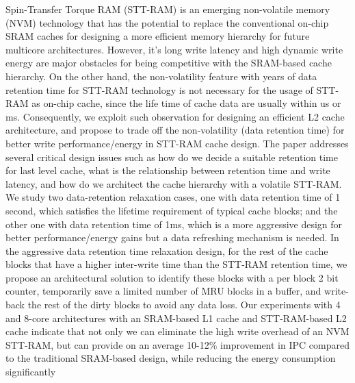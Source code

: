 \singlespacing

Spin-Transfer Torque RAM (STT-RAM) is an emerging non-volatile memory (NVM)
technology that has the potential to replace the conventional
on-chip SRAM caches for designing a more efficient memory hierarchy for
future multicore architectures.
However, it's long write latency and high dynamic
write energy are major obstacles for being competitive with the SRAM-based cache hierarchy.
On the other hand, the non-volatility feature with years of data retention time for STT-RAM technology is not necessary for the usage of STT-RAM as on-chip cache, since the life time of cache data are usually within us or ms. Consequently,  we exploit such observation for designing an efficient L2 cache
architecture, and propose to trade off the non-volatility (data retention time)
for better write performance/energy in STT-RAM cache design. The paper addresses several critical design issues such as how do we decide a suitable retention time for last level cache,
what is the relationship between retention time and write latency,
and how do we architect the cache hierarchy with a volatile STT-RAM.
We study two
data-retention relaxation cases, one with data retention time of 1 second, which satisfies the lifetime requirement of typical cache blocks; and the other one with data retention time of 1ms, which is a more aggressive design for better performance/energy gains but a data refreshing mechanism is needed.
In the aggressive data retention time relaxation design, for the rest of the cache blocks that have a higher inter-write
time than the STT-RAM retention time, we propose an architectural solution to identify these blocks
with a per block 2 bit counter, temporarily save a limited number of MRU blocks in a buffer,
and write-back the rest of the dirty blocks to avoid any data loss.
Our experiments with 4 and 8-core architectures with an SRAM-based L1 cache and STT-RAM-based L2 cache
indicate that not only we can eliminate the high write overhead of an NVM STT-RAM, but can provide
on an average 10-12\% improvement in IPC compared to the traditional SRAM-based
design, while reducing the energy consumption significantly

